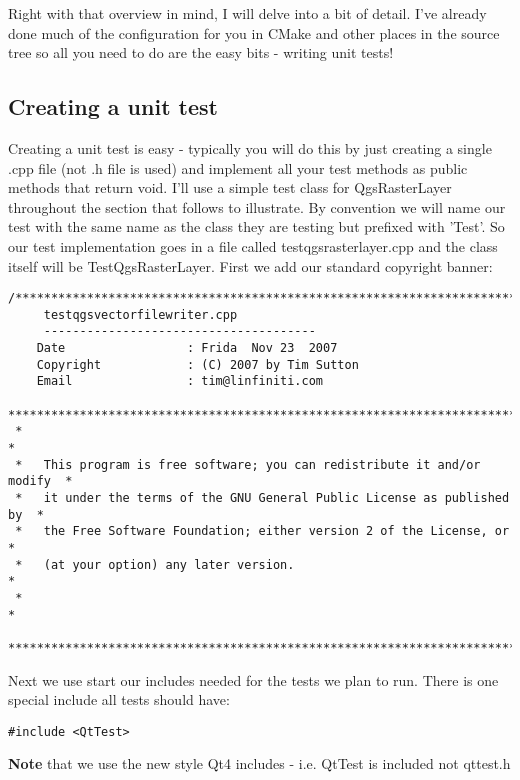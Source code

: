 Right with that overview in mind, I will delve into a bit of detail. I've
already done much of the configuration for you in CMake and other places in the
source tree so all you need to do are the easy bits - writing unit tests!

\hypertarget{toc49}{}
\subsection{Creating a unit test}
Creating a unit test is easy - typically you will do this by just creating a
single .cpp file (not .h file is used) and implement all your test methods as
public methods that return void. I'll use a simple test class for
QgsRasterLayer throughout the section that follows to illustrate. By convention
we will name our test with the same name as the class they are testing but
prefixed with 'Test'.  So our test implementation goes in a file called
testqgsrasterlayer.cpp and the class itself will be TestQgsRasterLayer. First
we add our standard copyright banner:

\begin{verbatim}
/***************************************************************************
     testqgsvectorfilewriter.cpp
     --------------------------------------
    Date                 : Frida  Nov 23  2007
    Copyright            : (C) 2007 by Tim Sutton
    Email                : tim@linfiniti.com
 ***************************************************************************
 *                                                                         *
 *   This program is free software; you can redistribute it and/or modify  *
 *   it under the terms of the GNU General Public License as published by  *
 *   the Free Software Foundation; either version 2 of the License, or     *
 *   (at your option) any later version.                                   *
 *                                                                         *
 ***************************************************************************/
\end{verbatim}

Next we use start our includes needed for the tests we plan to run. There is 
one special include all tests should have:

\begin{verbatim}
#include <QtTest>
\end{verbatim}

\textbf{Note} that we use the new style Qt4 includes - i.e. QtTest is included not
qttest.h

